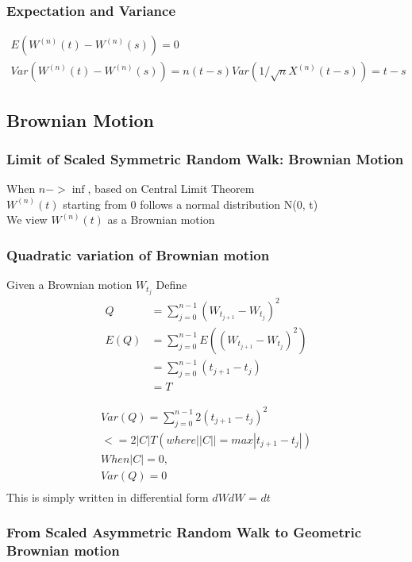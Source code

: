 \documentclass[a4paper]{article}
\begin{document}
\subsubsection{Expectation and Variance}
\begin{align*}
E(W^{(n)}(t) - W^{(n)}(s)) =0 \\
Var(W^{(n)}(t) - W^{(n)}(s)) = n(t-s) Var(1/\sqrt{n} X^{(n)} (t-s) )
=t - s
\end{align*}


\subsection{Brownian Motion}
\subsubsection{Limit of Scaled Symmetric Random Walk: Brownian Motion} 
When $n-> \inf$, based on Central Limit Theorem\\ 
$W^{(n)}(t)$ starting from 0 follows a normal distribution N(0, t)\\
We view $W^{(n)}(t)$ as a Brownian motion\\

\subsubsection {Quadratic variation of Brownian motion }
 Given a Brownian motion $W_{t_j}$
 Define 
 \begin{align*}
	Q &= \sum_{j=0} ^{n-1} (W_{t_{j+1}} - W_{t_j})^2 \\
 	E(Q)  &= \sum_{j=0} ^{n-1} E ((W_{t_{j+1}} - W_{t_j})^2) \\
       & = \sum_{j=0} ^{n-1} (t_{j+1} - t_j) \\
       & = T
\end{align*}

 \begin{align*}
   Var(Q) = \sum_{j=0}^{n-1} 2(t_{j+1} - t_{j})^2 \\
   <= 2|C|T (where ||C|| = max|t_{j+1} - t_{j} |) \\
    When |C| = 0, \\
    Var(Q) = 0 \\
 \end{align*}
This is simply written in differential form $dW dW$ = $dt$\\

\subsubsection{From Scaled Asymmetric Random Walk to Geometric Brownian motion}
\end{document}
